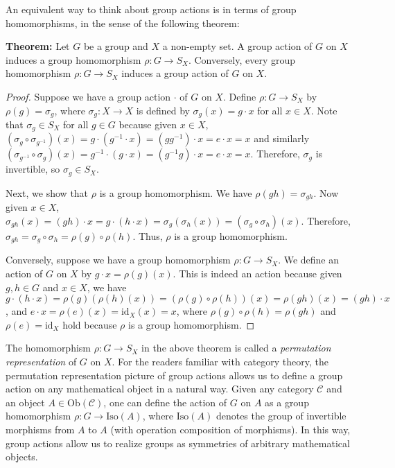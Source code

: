 \documentclass[12pt]{article}
\newcommand{\vs}{\vskip10pt}
\begin{document}
	\vs 
	
	An equivalent way to think about group actions is in terms of group homomorphisms, in the sense of the following theorem: 
	
	\vs 
	
	\textbf{Theorem: } Let $G$ be a group and $X$ a non-empty set. A group action of $G$ on $X$ induces a group homomorphism $\rho: G \rightarrow S_X$. Conversely, every group homomorphism $\rho: G \rightarrow S_X$ induces a group action of $G$ on $X$. 
	
	\begin{proof}
		
	Suppose we have a group action $\cdot$ of $G$ on $X$. Define $\rho: G \rightarrow S_X$ by $\rho(g) = \sigma_g$, where $\sigma_g: X \rightarrow X$ is defined by $\sigma_g(x) = g \cdot x$ for all $x \in X$. Note that $\sigma_g \in S_X$ for all $g \in G$ because given $x \in X$, $(\sigma_g \circ \sigma_{g^{-1}}) (x) = g \cdot (g^{-1} \cdot x) = (gg^{-1}) \cdot x = e \cdot x = x$ and similarly $(\sigma_{g^{-1}} \circ \sigma_g) (x) = g^{-1} \cdot (g \cdot x) = (g^{-1} g) \cdot x = e \cdot x = x$. Therefore, $\sigma_g$ is invertible, so $\sigma_g \in S_X$. 
	
	\vskip5pt
	
	Next, we show that $\rho$ is a group homomorphism. We have $\rho(gh) = \sigma_{gh}$. Now given $x \in X$, $\sigma_{gh}(x) = (gh) \cdot x = g \cdot (h \cdot x) = \sigma_g(\sigma_h (x)) = (\sigma_g \circ \sigma_h) (x)$. Therefore, $\sigma_{gh} = \sigma_g \circ \sigma_h = \rho(g) \circ \rho(h)$. Thus, $\rho$ is a group homomorphism. 
	
	\vs 
	
	Conversely, suppose we have a group homomorphism $\rho: G \rightarrow S_X$. We define an action of $G$ on $X$ by $g \cdot x = \rho(g)(x)$. This is indeed an action because given $g,h \in G$ and $x \in X$, we have $g \cdot (h \cdot x) = \rho(g) (\rho(h) (x)) = (\rho(g) \circ \rho(h)) (x) = \rho(gh) (x) = (gh) \cdot x$, and $e \cdot x = \rho(e) (x) = \text{id}_X (x) = x$, where $\rho(g) \circ \rho(h) = \rho(gh)$ and $\rho(e) = \text{id}_X$ hold because $\rho$ is a group homomorphism. 
	\end{proof}
	
	\vs 
	
	The homomorphism $\rho: G \rightarrow S_X$ in the above theorem is called a \textit{permutation representation} of $G$ on $X$. For the readers familiar with category theory, the permutation representation picture of group actions allows us to define a group action on any mathematical object in a natural way. Given any category $\mathcal{C}$ and an object $A \in \text{Ob} (\mathcal{C})$, one can define the action of $G$ on $A$ as a group homomorphism $\rho: G \rightarrow \text{Iso}(A)$, where $\text{Iso}(A)$ denotes the group of invertible morphisms from $A$ to $A$ (with operation composition of morphisms). In this way, group actions allow us to realize groups as symmetries of arbitrary mathematical objects. 
	
\end{document}
